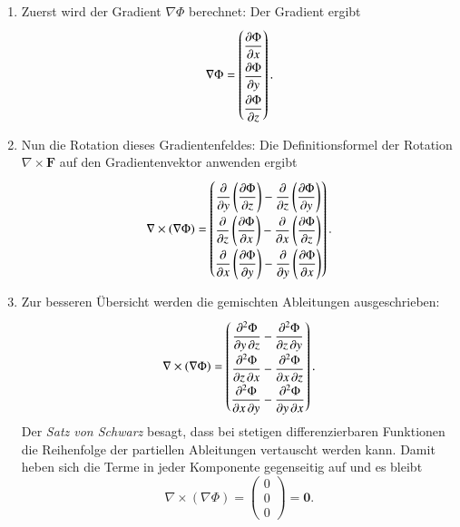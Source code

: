 \begin{enumerate}
    \item Zuerst wird der Gradient $\nabla\Phi$ berechnet:
    Der Gradient ergibt
    \[
    \nabla \Phi =
	\renewcommand{\arraystretch}{2.0}
    \begin{pmatrix}
        \displaystyle \frac{\partial \Phi}{\partial x} \\
        \displaystyle \frac{\partial \Phi}{\partial y} \\
        \displaystyle \frac{\partial \Phi}{\partial z}
    \end{pmatrix}.
    \]

    \item Nun die Rotation dieses Gradientenfeldes: Die Definitionsformel
    der Rotation $\nabla \times \boldsymbol{F}$ auf den Gradientenvektor
    anwenden ergibt
    \[
    \nabla \times (\nabla \Phi) =
	\renewcommand{\arraystretch}{2.0}
    \begin{pmatrix}
        \displaystyle\frac{\partial}{\partial y}\left(\frac{\partial \Phi}{\partial z}\right) - \frac{\partial}{\partial z}\left(\frac{\partial \Phi}{\partial y}\right) \\
        \displaystyle\frac{\partial}{\partial z}\left(\frac{\partial \Phi}{\partial x}\right) - \frac{\partial}{\partial x}\left(\frac{\partial \Phi}{\partial z}\right) \\
        \displaystyle\frac{\partial}{\partial x}\left(\frac{\partial \Phi}{\partial y}\right) - \frac{\partial}{\partial y}\left(\frac{\partial \Phi}{\partial x}\right)
    \end{pmatrix}.
    \]

    \item %
    
    Zur besseren Übersicht werden die gemischten Ableitungen ausgeschrieben:
    \[
    \nabla \times (\nabla \Phi) =
	\renewcommand{\arraystretch}{2.0}
    \begin{pmatrix}
        \displaystyle\frac{\partial^2 \Phi}{\partial y\, \partial z} - \frac{\partial^2 \Phi}{\partial z\, \partial y} \\
        \displaystyle\frac{\partial^2 \Phi}{\partial z\, \partial x} - \frac{\partial^2 \Phi}{\partial x\, \partial z} \\
        \displaystyle\frac{\partial^2 \Phi}{\partial x\, \partial y} - \frac{\partial^2 \Phi}{\partial y\, \partial x}
    \end{pmatrix}.
    \]
    Der \emph{Satz von Schwarz} besagt, dass bei stetigen differenzierbaren
    Funktionen die Reihenfolge der partiellen Ableitungen vertauscht werden
    kann.
    Damit heben sich die Terme in jeder Komponente gegenseitig auf
    und es bleibt
    \[
    \nabla \times (\nabla \Phi)  =
    \begin{pmatrix}
        0 \\
        0 \\
        0
    \end{pmatrix} = \boldsymbol{0}.
    \]
\end{enumerate}

